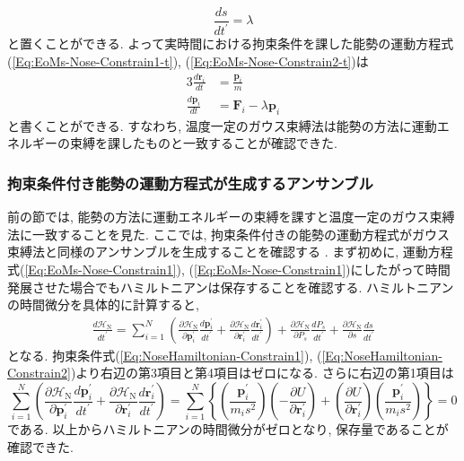 \begin{equation}
    \frac{ds}{dt^{\prime}} = \lambda
\end{equation}
と置くことができる. 
よって実時間における拘束条件を課した能勢の運動方程式(\ref{Eq:EoMs-Nose-Constrain1-t}), (\ref{Eq:EoMs-Nose-Constrain2-t})は
\begin{alignat}{3}
    \frac{d \bm{r}_{i}}{dt}
    &=
    \frac{\bm{p}_{i}}{m}
    \\
    \frac{d \bm{p}_{i}}{dt}
    &=
    \bm{F}_{i} - \lambda \bm{p}_{i}
\end{alignat}
と書くことができる.
すなわち, 温度一定のガウス束縛法は能勢の方法に運動エネルギーの束縛を課したものと一致することが確認できた.

\subsubsection{拘束条件付き能勢の運動方程式が生成するアンサンブル}
前の節では, 能勢の方法に運動エネルギーの束縛を課すと温度一定のガウス束縛法に一致することを見た.
ここでは, 拘束条件付きの能勢の運動方程式がガウス束縛法と同様のアンサンブルを生成することを確認する \cite{Nose1991}.
まず初めに, 運動方程式(\ref{Eq:EoMs-Nose-Constrain1}), (\ref{Eq:EoMs-Nose-Constrain1})にしたがって時間発展させた場合でもハミルトニアンは保存することを確認する.
ハミルトニアンの時間微分を具体的に計算すると,
\begin{align}
    \frac{d \mathcal{H}_{\mathrm{N}}}{dt^{\prime}}
    =
    \sum_{i=1}^{N}
    \left(
        \frac{\partial \mathcal{H}_{\mathrm{N}}}{\partial \bm{p}_{i}^{\prime}}
        \frac{d \bm{p}_{i}^{\prime}}{dt^{\prime}}
        +
        \frac{\partial \mathcal{H}_{\mathrm{N}}}{\partial \bm{r}_{i}^{\prime}}
        \frac{d \bm{r}_{i}^{\prime}}{dt^{\prime}}
    \right)
    +
    \frac{\partial \mathcal{H}_{\mathrm{N}}}{\partial P_{s}}
    \frac{d P_{s}}{dt^{\prime}}
    +
    \frac{\partial \mathcal{H}_{\mathrm{N}}}{\partial s}
    \frac{d s}{dt^{\prime}}
\end{align}
となる. 拘束条件式(\ref{Eq:NoseHamiltonian-Constrain1}), (\ref{Eq:NoseHamiltonian-Constrain2})より右辺の第3項目と第4項目はゼロになる.
さらに右辺の第1項目は
\begin{equation}
    \sum_{i=1}^{N}
    \left(
        \frac{\partial \mathcal{H}_{\mathrm{N}}}{\partial \bm{p}_{i}^{\prime}}
        \frac{d \bm{p}_{i}^{\prime}}{dt^{\prime}}
        +
        \frac{\partial \mathcal{H}_{\mathrm{N}}}{\partial \bm{r}_{i}^{\prime}}
        \frac{d \bm{r}_{i}^{\prime}}{dt^{\prime}}
    \right)
    =
    \sum_{i=1}^{N}
    \left\{
        \left(
            \frac{\bm{p}_{i}^{\prime}}{m_{i}s^{2}}
        \right)
        \left(
            -\frac{\partial U}{\partial \bm{r}_{i}^{\prime}}
        \right)
        +
        \left(
            \frac{\partial U}{\partial \bm{r}_{i}^{\prime}}
        \right)
        \left(
            \frac{\bm{p}_{i}^{\prime}}{m_{i}s^{2}}
        \right)
    \right\}
    =
    0
\end{equation}
である. 以上からハミルトニアンの時間微分がゼロとなり, 保存量であることが確認できた.

